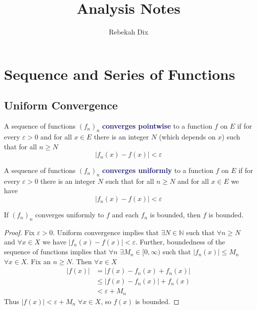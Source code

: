 \documentclass[11pt]{article}
\title{Analysis Notes}
\author{Rebekah Dix}
\numberwithin{equation}{section}
\newcommand{\navy}[1]{\textcolor{MidnightBlue}{\bf #1}}
\theoremstyle{definition}
\theoremstyle{definition}
\newcommand{\1}{\mathbbm 1}
\newcommand{\e}{\varepsilon}
\newcommand{\NN}{\mathbb N}
\begin{document}
\maketitle
\tableofcontents
\newpage 

\section{Sequence and Series of Functions}

\subsection{Uniform Convergence}

\begin{definition}
	A sequence of functions $(f_n)_n$ \navy{converges pointwise} to a function $f$ on $E$ if for every $\e > 0$ and for all $x \in E$ there is an integer $N$ (which depends on $x$) such that for all $n \geq N$
	\begin{equation*}
		|f_n(x) - f(x)| < \e
	\end{equation*}
\end{definition}

\begin{definition}
	A sequence of functions $(f_n)_n$ \navy{converges uniformly} to a function $f$ on $E$ if for every $\e > 0$ there is an integer $N$ such that for all $n \geq N$ and for all $x \in E$ we have
	\begin{equation*}
		|f_n(x) - f(x)| < \e
	\end{equation*}
\end{definition}

\begin{theorem}
	If $(f_n)_n$ converges uniformly to $f$ and each $f_n$ is bounded, then $f$ is bounded. 
\end{theorem}
\begin{proof}
	Fix $\e > 0$. Uniform convergence implies that $\exists N \in \NN$ such that $\forall n \geq N$ and $\forall x \in X$ we have $|f_n(x) - f(x)| < \e$. Further, boundedness of the sequence of functions implies that $\forall n$ $\exists M_n \in [0,\infty)$ such that $|f_n(x)| \leq M_n$ $\forall x \in X$. Fix an $n \geq N$. Then $\forall x \in X$
	\begin{align*}
		|f(x)| &= |f(x) - f_n(x) + f_n(x)| \\
		&\leq |f(x) - f_n(x)| + f_n(x) \tag{trianlge inequality} \\
		& < \e + M_n \tag{uniform convergence and boundedness}
	\end{align*}
	Thus $|f(x)| < \e + M_n$ $\forall x \in X$, so $f(x)$ is bounded.
\end{proof}
\end{document}
